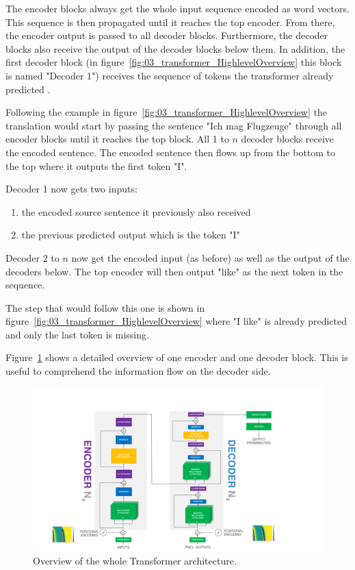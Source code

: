 The encoder blocks always get the whole input sequence encoded as word vectors. This sequence is then propagated until it reaches the top encoder. From there, the encoder output is passed to all decoder blocks. Furthermore, the decoder blocks also receive the output of the decoder blocks below them. In addition, the first decoder block {(in figure~\ref{fig:03_transformer_HighlevelOverview} this block is named "Decoder 1")} receives the sequence of tokens the transformer already predicted \cite{Vaswani2017d}. 
\medskip

Following the example in figure~\ref{fig:03_transformer_HighlevelOverview} the translation would start by passing the sentence "Ich mag Flugzeuge" through all encoder blocks until it reaches the top block. All 1 to $n$ decoder blocks receive the encoded sentence. The encoded sentence then flows up from the bottom to the top where it outputs the first token "I". 

Decoder 1 now gets two inputs: 

\begin{enumerate}
	\item the encoded source sentence it previously also received
	\item the previous predicted output which is the token "I"
\end{enumerate}

Decoder 2 to $n$ now get the encoded input {(as before)} as well as the output of the decoders below. The top encoder will then output "like" as the next token in the sequence. 

The step that would follow this one is shown in figure~\ref{fig:03_transformer_HighlevelOverview} where "I like" is already predicted and only the last token is missing.
\bigskip

Figure~\ref{fig:03_transformer_overview} shows a detailed overview of one encoder and one decoder block. This is useful to comprehend the information flow on the decoder side.

\begin{figure}[t]
	\centering
	\includegraphics[width=\textwidth]{figures/03_theory/03_transformerArchitectureOverview}
	\caption{Overview of the whole Transformer architecture.}
	\label{fig:03_transformer_overview}
\end{figure}

